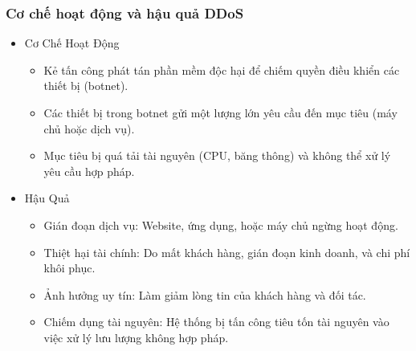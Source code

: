 \documentclass[13pt]{article}
\begin{document}
                \subsubsection{Cơ chế hoạt động và hậu quả DDoS  }
                \begin{itemize}
                \item Cơ Chế Hoạt Động
                    \begin{itemize}
                        \item Kẻ tấn công phát tán phần mềm độc hại để chiếm quyền điều khiển các thiết bị (botnet).
                        \item Các thiết bị trong botnet gửi một lượng lớn yêu cầu đến mục tiêu (máy chủ hoặc dịch vụ).
                        \item Mục tiêu bị quá tải tài nguyên (CPU, băng thông) và không thể xử lý yêu cầu hợp pháp.
                    \end{itemize}

                \item Hậu Quả
                    \begin{itemize}
                        \item Gián đoạn dịch vụ: Website, ứng dụng, hoặc máy chủ ngừng hoạt động.
                        \item Thiệt hại tài chính: Do mất khách hàng, gián đoạn kinh doanh, và chi phí khôi phục.
                        \item Ảnh hưởng uy tín: Làm giảm lòng tin của khách hàng và đối tác.
                        \item Chiếm dụng tài nguyên: Hệ thống bị tấn công tiêu tốn tài nguyên vào việc xử lý lưu lượng không hợp pháp.
                        
                    \end{itemize}
                
                \end{itemize}
\end{document}
